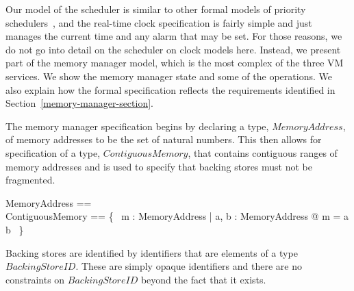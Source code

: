 \documentclass[a4paper,10pt]{report}
\begin{document}
Our model of the scheduler is similar to other formal models of priority
schedulers~\cite{ferreira2014, gotsman2013, klein2014, lime2009}, and the
real-time clock specification is fairly simple and just manages the current time
and any alarm that may be set. For those reasons, we do not go into detail on
the scheduler on clock models here. Instead, we present part of the memory
manager model, which is the most complex of the three VM services.  We show the
memory manager state and some of the operations. We also explain how the formal
specification reflects the requirements identified in
Section~\ref{memory-manager-section}.

The memory manager specification begins by declaring a type, $MemoryAddress$, of
memory addresses to be the set of natural numbers.  This then allows for
specification of a type, $ContiguousMemory$, that contains contiguous ranges of
memory addresses and is used to specify that backing stores must not be
fragmented.
%
\begin{zed}
  MemoryAddress == \nat \\
  ContiguousMemory == 
  \{~ m : \power MemoryAddress | \exists a, b : MemoryAddress @ m = a \upto b ~\}
\end{zed}
%
Backing stores are identified by identifiers that are elements of a type
$BackingStoreID$. These are simply opaque identifiers and there are no
constraints on $BackingStoreID$ beyond the fact that it exists.
\end{document}
